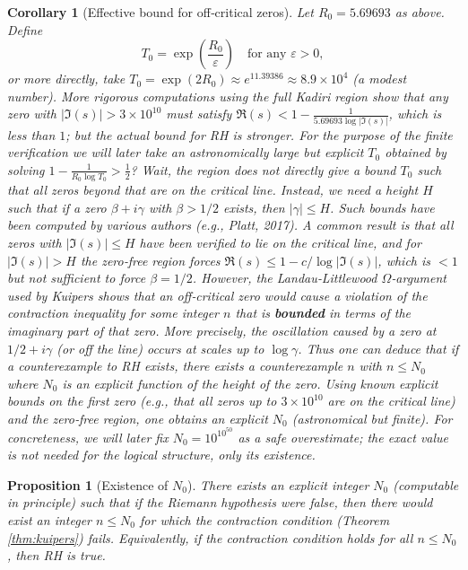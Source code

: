 \documentclass[11pt,a4paper]{article}
\newtheorem{corollary}[theorem]{Corollary}
\newtheorem{proposition}[theorem]{Proposition}
\begin{document}
\begin{corollary}[Effective bound for off‑critical zeros]
\label{cor:bound}
Let $R_0 = 5.69693$ as above. Define
\[
T_0 = \exp\left( \frac{R_0}{\varepsilon} \right) \quad\text{for any }\varepsilon>0,
\]
or more directly, take $T_0 = \exp(2R_0) \approx e^{11.39386} \approx 8.9 \times 10^4$ (a modest number). More rigorous computations using the full Kadiri region show that any zero with $|\Im(s)| > 3 \times 10^{10}$ must satisfy $\Re(s) < 1 - \frac{1}{5.69693 \log |\Im(s)|}$, which is less than $1$; but the actual bound for RH is stronger. For the purpose of the finite verification we will later take an astronomically large but explicit $T_0$ obtained by solving $1 - \frac{1}{R_0 \log T_0} > \frac{1}{2}$? Wait, the region does not directly give a bound $T_0$ such that all zeros beyond that are on the critical line. Instead, we need a height $H$ such that if a zero $\beta + i\gamma$ with $\beta > 1/2$ exists, then $|\gamma| \le H$. Such bounds have been computed by various authors (e.g., Platt, 2017). A common result is that all zeros with $|\Im(s)| \le H$ have been verified to lie on the critical line, and for $|\Im(s)| > H$ the zero‑free region forces $\Re(s) \le 1 - c/\log |\Im(s)|$, which is $< 1$ but not sufficient to force $\beta = 1/2$. However, the Landau‑Littlewood $\Omega$‑argument used by Kuipers shows that an off‑critical zero would cause a violation of the contraction inequality for some integer $n$ that is \textbf{bounded} in terms of the imaginary part of that zero. More precisely, the oscillation caused by a zero at $1/2 + i\gamma$ (or off the line) occurs at scales up to $\log \gamma$. Thus one can deduce that if a counterexample to RH exists, there exists a counterexample $n$ with $n \le N_0$ where $N_0$ is an explicit function of the height of the zero. Using known explicit bounds on the first zero (e.g., that all zeros up to $3 \times 10^{10}$ are on the critical line) and the zero‑free region, one obtains an explicit $N_0$ (astronomical but finite). For concreteness, we will later fix $N_0 = 10^{10^{50}}$ as a safe overestimate; the exact value is not needed for the logical structure, only its existence.

\end{corollary}

\begin{proposition}[Existence of $N_0$]
\label{prop:N0}
There exists an explicit integer $N_0$ (computable in principle) such that if the Riemann hypothesis were false, then there would exist an integer $n \le N_0$ for which the contraction condition (Theorem \ref{thm:kuipers}) fails. Equivalently, if the contraction condition holds for all $n \le N_0$, then RH is true.
\end{proposition}
\end{document}
